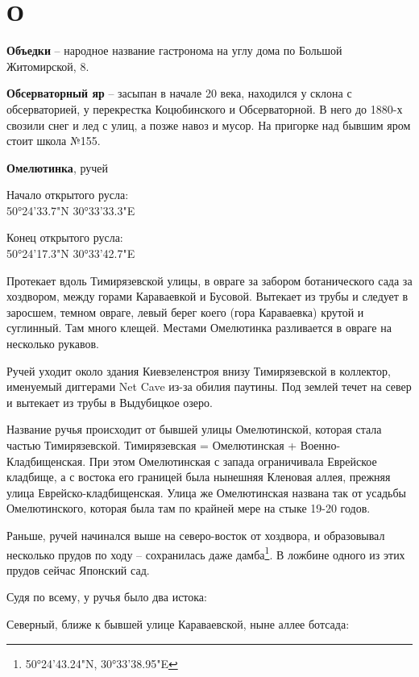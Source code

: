 \chapter*{О}

\textbf{Объедки} – народное название гастронома на углу дома по Большой Житомирской, 8.\\

\medskip

\textbf{Обсерваторный яр} – засыпан в начале 20 века, находился у склона с обсерваторией, у перекрестка Коцюбинского и Обсерваторной. В него до 1880-х свозили снег и лед с улиц, а позже навоз и мусор. На пригорке над бывшим яром стоит школа №155.\\

\medskip

\textbf{Омелютинка}, ручей

Начало открытого русла:\\50°24'33.7"N 30°33'33.3"E

Конец открытого русла:\\ 50°24'17.3"N 30°33'42.7"E

Протекает вдоль Тимирязевской улицы, в овраге за забором ботанического сада за хоздвором, между горами Караваевкой и Бусовой. Вытекает из трубы и следует в заросшем, темном овраге, левый берег коего (гора Караваевка) крутой и суглинный. Там много клещей. Местами Омелютинка разливается в овраге на несколько рукавов.

Ручей уходит около здания Киевзеленстроя внизу Тимирязевской в коллектор, именуемый диггерами Net Cave из-за обилия паутины. Под землей течет на север и вытекает из трубы в Выдубицкое озеро.

Название ручья происходит от бывшей улицы Омелютинской, которая стала частью Тимирязевской. Тимирязевская = Омелютинская + Военно-Кладбищенская. При этом Омелютинская с запада ограничивала Еврейское кладбище, а с востока его границей была нынешняя Кленовая аллея, прежняя улица Еврейско-кладбищенская. Улица же Омелютинская названа так от усадьбы Омелютинского, которая была там по крайней мере на стыке 19-20 годов.

Раньше, ручей начинался выше на северо-восток от хоздвора, и образовывал несколько прудов по ходу – сохранилась даже дамба\footnote{50°24'43.24"N,  30°33'38.95"E}. В ложбине одного из этих прудов сейчас Японский сад.

Судя по всему, у ручья было два истока:

Северный, ближе к бывшей улице Караваевской, ныне аллее ботсада: 


